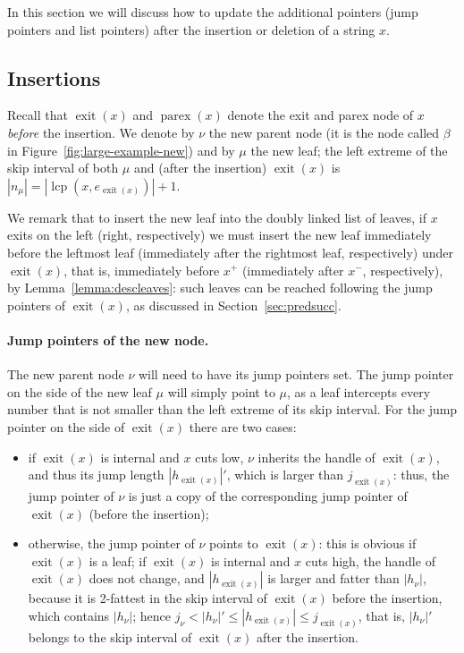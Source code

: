 \documentclass[a4paper]{article}
\newcommand{\exit}[1]{\operatorname{exit}(#1)}
\newcommand{\parex}[1]{\operatorname{parex}(#1)}
\newcommand{\lcp}{\operatorname{lcp}}
\newcommand{\?}{\mskip1.5mu}
\begin{document}
In this section we will discuss how to update the additional pointers (jump pointers and list pointers) after the insertion or deletion of a string $x$. 

\subsection{Insertions}

Recall that $\exit x$ and $\parex x$ denote the exit and parex node of $x$ \emph{before} the insertion.
We denote by $\nu$ the new parent node (it is the node called $\beta$ in Figure~\ref{fig:large-example-new})
and by $\mu$ the new leaf; the left extreme of the skip interval of both $\mu$ and (after the insertion) $\exit x$ 
is $|n_\mu|=|\lcp(x,e_{\exit x})|+1$.

We remark that to insert the new leaf into the doubly linked list of leaves, if
$x$ exits on the left (right, respectively) we must insert the new leaf
immediately before the leftmost leaf (immediately after the rightmost leaf, respectively) under $\exit x$,
that is, immediately before $x^+$ (immediately after $x^-$, respectively), by Lemma~\ref{lemma:descleaves}:
such leaves can be reached following the jump pointers of $\exit x$, as discussed in Section~\ref{sec:predsucc}.

\paragraph{Jump pointers of the new node.}
The new parent node $\nu$ will
need to have its jump pointers set. The jump pointer on the side of the new leaf $\mu$ will simply point to $\mu$, as a leaf
intercepts every number that is not smaller than the left extreme of its skip interval. For the jump pointer on the
side of $\exit x$ there are two cases:
\begin{itemize}
\item if $\exit x$ is internal and $x$ cuts low, $\nu$ inherits the handle of $\exit x$, and thus its jump length $|h_{\exit x}|'$, which
is larger than $j_{\exit x}$: thus, the jump pointer of $\nu$ is just a copy of the corresponding jump pointer of $\exit x$ (before the insertion);
\item otherwise, the jump pointer of $\nu$ points to $\exit x$: this is obvious if $\exit x$ is a leaf; if $\exit x$ is internal and $x$ cuts high,
the handle of $\exit x$ does not change, and $|h_{\exit x}|$ is larger and fatter than $|h_\nu|$, because it is 2-fattest in 
the skip interval of $\exit x$ before the insertion, which contains $|h_\nu|$; hence $j_\nu<|h_\nu|'\leq|h_{\exit x}|\leq j_{\exit x}$, that is,
$|h_\nu|'$ belongs to the skip interval of $\exit x$ after the insertion.
\end{itemize}
\end{document}

